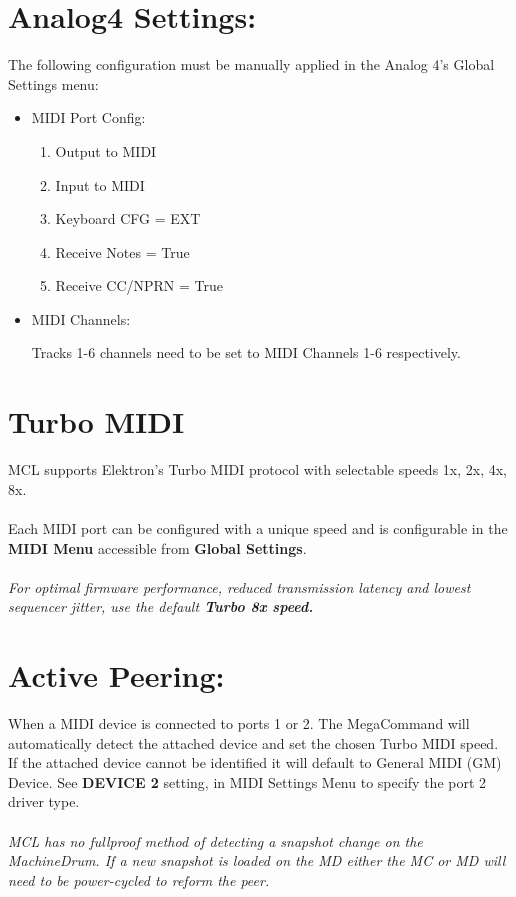 \section{Analog4 Settings:}

The following configuration must be manually applied in the Analog 4's Global Settings menu:

\begin{itemize}

\item{MIDI Port Config:}
\begin{enumerate}
\item{Output to MIDI}
\item{Input to MIDI}
\item{Keyboard CFG = EXT}
\item{Receive Notes = True}
\item{Receive CC/NPRN = True}
\end{enumerate}
\item{MIDI Channels:}

Tracks 1-6 channels need to be set to MIDI Channels 1-6 respectively.

\end{itemize}

\section{Turbo MIDI}

MCL supports Elektron's Turbo MIDI protocol with selectable speeds 1x, 2x, 4x, 8x.\\
\\
Each MIDI port can be configured with a unique speed and is configurable in the \textbf{MIDI Menu} accessible from \textbf{Global Settings}.
\\
\\
\textit{For optimal firmware performance, reduced transmission latency and lowest sequencer jitter, use the default \textbf{Turbo 8x speed.}}

\section{Active Peering:}

When a MIDI device is connected to ports 1 or 2. The MegaCommand will automatically detect the attached device and set the chosen Turbo MIDI speed. If the attached device cannot be identified it will default to General MIDI (GM) Device. See \textbf{DEVICE 2} setting, in MIDI Settings Menu to specify the port 2 driver type.\\
\\
\textit{MCL has no fullproof method of detecting a snapshot change on the MachineDrum. If a new snapshot is loaded on the MD either the MC or MD will need to be power-cycled to reform the peer.}


 
